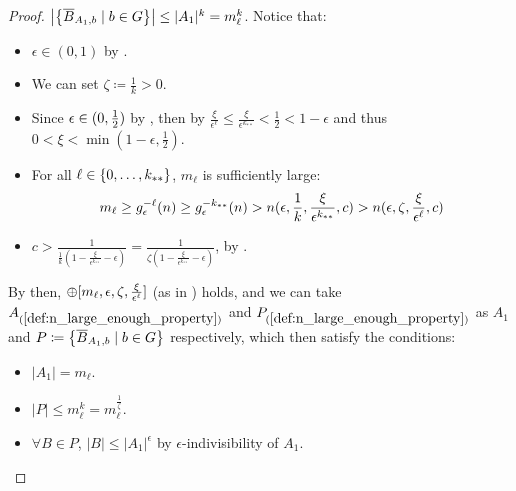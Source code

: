 \begin{lemma}[Claim 4.21]
\begin{proof}
            $\bigl| \bigl\{ \overline{B}_{A_1,b} \mid b \in G \bigr\} \bigr| \leq |A_1|^k = m_\ell^k$.
            Notice that:
            \begin{itemize}
                \item $\epsilon \in (0,1)$ by .
                \item We can set $\zeta \coloneqq \frac{1}{k} > 0$.
                \item Since $\epsilon \in ( 0, \frac{1}{2} )$ by ,
                    then by 
                    $\frac{\xi}{\epsilon^\ell} \leq \frac{\xi}{\epsilon^{k_{**}}} < \frac{1}{2} < 1 - \epsilon$ and
                    thus $0 < \xi < \min(1-\epsilon, \frac{1}{2})$.
                \item For all $\ell \in \{ 0,\dots,k_{**} \}$, $m_\ell$ is sufficiently large:
                    \[
                        m_\ell \geq g_\epsilon^{-\ell}(n) \geq g_\epsilon^{-k_{**}}(n) > n( \epsilon, \frac{1}{k},
                        \frac{\xi}{\epsilon^{k_{**}}}, c ) > n( \epsilon, \zeta, \frac{\xi}{\epsilon^{\ell}}, c )
                    \]
                \item $c > \frac{1}{\frac{1}{k} (1 - \frac{\xi}{\epsilon^{k_{**}}} - \epsilon)}
                    = \frac{1}{\zeta (1 - \frac{\xi}{\epsilon^{k_{**}}} - \epsilon)}$, by .
            \end{itemize}
            By  then, $\oplus[ m_\ell, \epsilon, \zeta, \frac{\xi}{\epsilon^\ell} ]$
            (as in ) holds, and we can take
            $A_{(\ref{def:n_large_enough_property})}$ and $P_{(\ref{def:n_large_enough_property})}$ as $A_1$ and
            $P \coloneqq \bigl\{ \overline{B}_{A_1,b} \mid b \in G \bigr\}$ respectively, which then satisfy the conditions:
            \begin{itemize}
                \item $|A_1| = m_\ell$.
                \item $|P| \leq m_\ell^k = m_\ell^{\frac{1}{\zeta}}$.
                \item $\forall B \in P$, $|B| \leq |A_1|^\epsilon$ by $\epsilon$-indivisibility of $A_1$.
            \end{itemize}

\end{proof}
\end{lemma}
